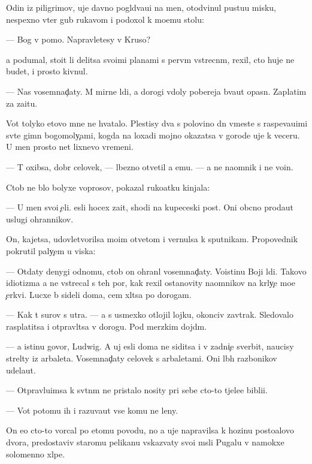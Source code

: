 \documentclass[10pt]{book}
\begin{document}
Odin iz piligrimov, uje davno pogl{\ia}d{\yi}va{\y}u{\x}i{\y} na men{\ia}, otodvinul pustu{\y}u misku, nespexno v{\yi}ter gub{\yi} rukavom i podoxol k mo{\y}emu stolu:

— Bog v pomo{\x}. Napravl{\ia}{\y}etesy v Kruso?

{\Y}a podumal, sto{\y}it li delitsa svo{\y}imi planami s perv{\yi}m vstrecn{\yi}m, rexil, cto huje ne budet, i prosto kivnul.

— Nas vosemnad{\c}aty. M{\yi} mirn{\yi}{\y}e l{\iu}di, a dorogi vdoly poberej{\y}a b{\yi}va{\y}ut opasn{\yi}. Zaplatim za za{\x}itu.

Vot tolyko etovo mne ne hvatalo. Plestisy dva s polovino{\y} dn{\ia} vmeste s raspeva{\y}u{\x}imi sv{\ia}t{\yi}{\y}e gimn{\yi} bogomoly{\c}ami, kogda na loxadi mojno okazatsa v gorode uje k veceru. U men{\ia} prosto net lixnevo vremeni.

— T{\yi} oxibsa, dobr{\yi}{\y} celovek, — l{\iu}bezno otvetil {\y}a {\y}emu. — {\Y}a ne na{\y}omnik i ne vo{\y}in.

Ctob{\yi} ne b{\yi}lo bolyxe voprosov, pokazal ruko{\y}atku kinjala:

— U men{\ia} svo{\y}i {\c}eli. {\Y}esli hocex za{\x}it{\yi}, shodi na kupeceski{\y} post. Oni ob{\yi}cno proda{\y}ut uslugi ohrannikov.

On, kajetsa, udovletvorilsa mo{\y}im otvetom i vernulsa k sputnikam. Propovednik pokrutil paly{\c}em u viska:

— Otdaty denygi odnomu, ctob{\yi} on ohran{\ia}l vosemnad{\c}aty. Voistinu Boj{\yf}i l{\iu}di. Takovo idiotizma {\y}a ne vstrecal s teh por, kak rexil ostanovity na{\y}omnikov na kr{\yi}ly{\c}e mo{\y}e{\y} {\c}erkvi. Lucxe b{\yi} sideli doma, cem xl{\ia}tsa po dorogam.

— Kak t{\yi} surov s utra. — {\Y}a s usmexko{\y} otlojil lojku, okonciv zavtrak. Sledovalo rasplatitsa i otpravl{\ia}tsa v dorogu. Pod merzkim dojd{\e}m.

— {\Y}a istinu govor{\iu}, Ludwig. A uj {\y}esli doma ne siditsa i v zadni{\c}e sverbit, naucisy strel{\ia}ty iz arbaleta. Vosemnad{\c}aty celovek s arbaletami. Oni l{\iu}b{\yi}h razbo{\y}nikov udela{\y}ut.

— Otpravl{\ia}{\y}u{\x}imsa k sv{\ia}t{\yi}n{\ia}m ne pristalo nosity pri sebe cto-to t{\ia}jele{\y}e bibli{\y}i.

— Vot potomu ih i razuva{\y}ut vse komu ne leny.

On {\y}e{\x}o cto-to vorcal po etomu povodu, no {\y}a uje napravilsa k hoz{\ia}{\y}inu posto{\y}alovo dvora, predostaviv staromu pelikanu v{\yi}skaz{\yi}vaty svo{\y}i m{\yi}sli Pugalu v namokxe{\y} solomenno{\y} xl{\ia}pe.
\end{document}
